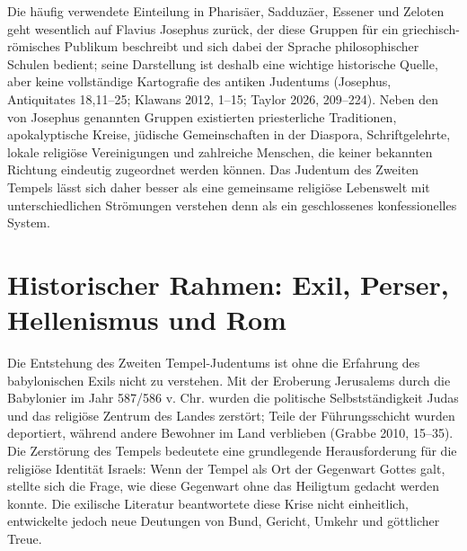 \documentclass[fontsize=12pt]{mybib}
\begin{document}
Die häufig verwendete Einteilung in Pharisäer, Sadduzäer, Essener und Zeloten geht wesentlich auf Flavius Josephus zurück, der diese Gruppen für ein griechisch-römisches Publikum beschreibt und sich dabei der Sprache philosophischer Schulen bedient; seine Darstellung ist deshalb eine wichtige historische Quelle, aber keine vollständige Kartografie des antiken Judentums (Josephus, Antiquitates 18,11–25; Klawans 2012, 1–15; Taylor 2026, 209–224). Neben den von Josephus genannten Gruppen existierten priesterliche Traditionen, apokalyptische Kreise, jüdische Gemeinschaften in der Diaspora, Schriftgelehrte, lokale religiöse Vereinigungen und zahlreiche Menschen, die keiner bekannten Richtung eindeutig zugeordnet werden können. Das Judentum des Zweiten Tempels lässt sich daher besser als eine gemeinsame religiöse Lebenswelt mit unterschiedlichen Strömungen verstehen denn als ein geschlossenes konfessionelles System.

\section{Historischer Rahmen: Exil, Perser, Hellenismus und Rom}

Die Entstehung des Zweiten Tempel-Judentums ist ohne die Erfahrung des babylonischen Exils nicht zu verstehen. Mit der Eroberung Jerusalems durch die Babylonier im Jahr 587/586 v. Chr. wurden die politische Selbstständigkeit Judas und das religiöse Zentrum des Landes zerstört; Teile der Führungsschicht wurden deportiert, während andere Bewohner im Land verblieben (Grabbe 2010, 15–35). Die Zerstörung des Tempels bedeutete eine grundlegende Herausforderung für die religiöse Identität Israels: Wenn der Tempel als Ort der Gegenwart Gottes galt, stellte sich die Frage, wie diese Gegenwart ohne das Heiligtum gedacht werden konnte. Die exilische Literatur beantwortete diese Krise nicht einheitlich, entwickelte jedoch neue Deutungen von Bund, Gericht, Umkehr und göttlicher Treue.
\end{document}
